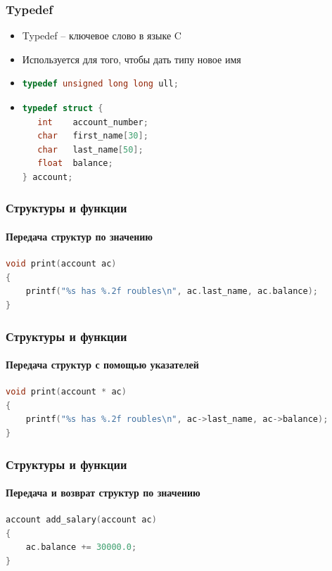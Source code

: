 \documentclass[14pt,pdf,hyperref={unicode}]{beamer}
\begin{document}
\begin{frame}[fragile]
\frametitle{Typedef} 
\begin{itemize}
\item Typedef -- ключевое слово в языке C \\
\item Используется для того, чтобы дать типу новое имя \\
\item 
\begin{lstlisting}[language=C++,basicstyle=\ttfamily,keywordstyle=\color{blue}]
typedef unsigned long long ull;
\end{lstlisting}
\item 
\begin{lstlisting}[language=C++,basicstyle=\ttfamily,keywordstyle=\color{blue}]
typedef struct {
   int    account_number;
   char   first_name[30];
   char   last_name[50];
   float  balance;
} account;
\end{lstlisting}
\end{itemize}
\end{frame}

\begin{frame}[fragile]
\frametitle{Структуры и функции} 
\framesubtitle{Передача структур по значению} 

\begin{lstlisting}[language=C++,basicstyle=\ttfamily,keywordstyle=\color{blue}]
void print(account ac)
{
    printf("%s has %.2f roubles\n", ac.last_name, ac.balance);
}
\end{lstlisting}
\end{frame}



\begin{frame}[fragile]
\frametitle{Структуры и функции} 
\framesubtitle{Передача структур с помощью указателей} 

\begin{lstlisting}[language=C++,basicstyle=\ttfamily,keywordstyle=\color{blue}]
void print(account * ac)
{
    printf("%s has %.2f roubles\n", ac->last_name, ac->balance);
}
\end{lstlisting}
\end{frame}

\begin{frame}[fragile]
\frametitle{Структуры и функции} 
\framesubtitle{Передача и возврат структур по значению} 

\begin{lstlisting}[language=C++,basicstyle=\ttfamily,keywordstyle=\color{blue}]
account add_salary(account ac)
{
    ac.balance += 30000.0;
}
\end{lstlisting}
\end{frame}
\end{document}

